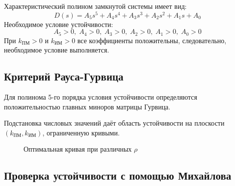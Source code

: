 \documentclass[14pt]{extreport}
\begin{document}
{Характеристический полином замкнутой системы имеет вид:
\[
D(s) = A_5 s^5 + A_4 s^4 + A_3 s^3 + A_2 s^2 + A_1 s + A_0
\]
Необходимое условие устойчивости:
\[
A_5 > 0,\; A_4 > 0,\; A_3 > 0,\; A_2 > 0,\; A_1 > 0,\; A_0 > 0
\]
При $k_{\text{ПМ}} > 0$ и $k_{\text{ИМ}} > 0$ все коэффициенты положительны, следовательно, необходимое условие выполняется.

\subsection*{Критерий Рауса-Гурвица}

Для полинома 5-го порядка условия устойчивости определяются положительностью главных миноров матрицы Гурвица.

Подстановка числовых значений даёт область устойчивости на плоскости $(k_{\text{ПМ}}, k_{\text{ИМ}})$, ограниченную кривыми.

\begin{figure}[H]
\centering
{}
\caption{Оптимальная кривая при различных $\rho$}
\end{figure}

\subsection{Проверка устойчивости с помощью Михайлова}

}
\end{document}
